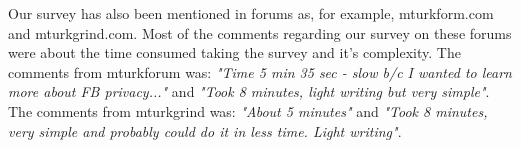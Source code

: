 Our survey has also been mentioned in forums as, for example, mturkform.com and mturkgrind.com. Most of the comments regarding our survey on these forums were about the time consumed taking the survey and it's complexity. The comments from mturkforum was: \textit{"Time 5 min 35 sec - slow b/c I wanted to learn more about FB privacy..."} and \textit{"Took 8 minutes, light writing but very simple"}.
The comments from mturkgrind was: \textit{"About 5 minutes"} and \textit{"Took 8 minutes, very simple and probably could do it in less time. Light writing"}.





